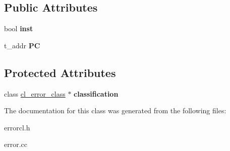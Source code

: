 \subsection*{Public Attributes}
\begin{DoxyCompactItemize}
\item 
\hypertarget{classcl__error_ab16e70c466947b908505113084543da8}{
bool {\bfseries inst}}
\label{classcl__error_ab16e70c466947b908505113084543da8}

\item 
\hypertarget{classcl__error_ab5b1cfac39b6c935634ed1a990887cb9}{
t\_\-addr {\bfseries PC}}
\label{classcl__error_ab5b1cfac39b6c935634ed1a990887cb9}

\end{DoxyCompactItemize}
\subsection*{Protected Attributes}
\begin{DoxyCompactItemize}
\item 
\hypertarget{classcl__error_ad44de3601a2155ceb126abb477de9c61}{
class \hyperlink{classcl__error__class}{cl\_\-error\_\-class} $\ast$ {\bfseries classification}}
\label{classcl__error_ad44de3601a2155ceb126abb477de9c61}

\end{DoxyCompactItemize}


The documentation for this class was generated from the following files:\begin{DoxyCompactItemize}
\item 
errorcl.h\item 
error.cc\end{DoxyCompactItemize}
